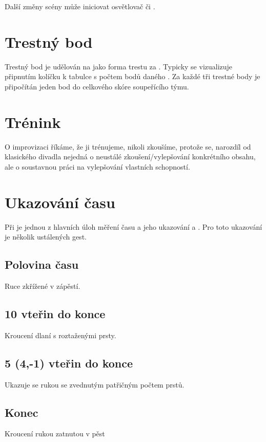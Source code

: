 Další změny scény může iniciovat osvětlovač či . 
 
 
 
\needspace{5cm} \section{Trestný bod} \label{trestný bod} Trestný bod je udělován na  jako forma trestu za . Typicky se vizualizuje připnutím kolíčku k tabulce s počtem bodů daného . Za každé tři trestné body je připočítán jeden bod do celkového skóre soupeřícího týmu. 
 
 
\needspace{5cm} \section{Trénink} \label{trénink} O improvizaci říkáme, že ji trénujeme, nikoli zkoušíme, protože se, narozdíl od klasického divadla 
nejedná o neustálé zkoušení/vylepšování konkrétního obsahu, ale 
o soustavnou práci na vylepšování vlastních schopností.  
 
\needspace{5cm} \section{Ukazování času} \label{ukazování času} Při  je jednou z hlavních úloh  měření času a jeho ukazování  a . 
Pro toto ukazování je několik ustálených gest.  
 
\subsection{Polovina času} Ruce zkřížené v zápěstí. 
 
\subsection{10 vteřin do konce} Kroucení dlaní s roztaženými prsty. 
 
\subsection{5 (4,-1) vteřin do konce} Ukazuje se rukou se zvednutým patřičným počtem prstů. 
 
\subsection{Konec} Kroucení rukou zatnutou v pěst 
 
